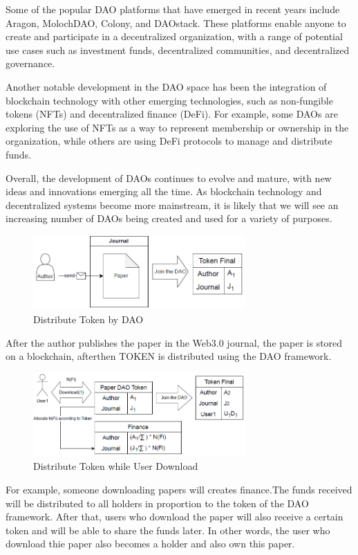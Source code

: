 \documentclass[lettersize,journal]{IEEEtran}
\begin{document}
Some of the popular DAO platforms that have emerged in recent years include Aragon, MolochDAO, Colony, and DAOstack. These platforms enable anyone to create and participate in a decentralized organization, with a range of potential use cases such as investment funds, decentralized communities, and decentralized governance.


Another notable development in the DAO space has been the integration of blockchain technology with other emerging technologies, such as non-fungible tokens (NFTs) and decentralized finance (DeFi). For example, some DAOs are exploring the use of NFTs as a way to represent membership or ownership in the organization, while others are using DeFi protocols to manage and distribute funds.

Overall, the development of DAOs continues to evolve and mature, with new ideas and innovations emerging all the time. As blockchain technology and decentralized systems become more mainstream, it is likely that we will see an increasing number of DAOs being created and used for a variety of purposes.


\begin{figure}[h]
  \centering
  \includegraphics[width=3.2in]{assets/daopaper.png}
  \caption{Distribute Token by DAO}
\end{figure}


After the author publishes the paper in the Web3.0 journal, the paper is stored on a blockchain, afterthen TOKEN is distributed using the DAO framework.


\begin{figure}[h]
  \centering
  \includegraphics[width=3.2in]{assets/download1.png}
  \caption{Distribute Token while User Download}
\end{figure}


For example, someone downloading papers will creates finance.The funds received will be distributed to all holders in proportion to the token of the DAO framework. After that, users who download the paper will also receive a certain token and will be able to share the funds later. In other words, the user who download thie paper also becomes a holder and also own this paper.
\end{document}
